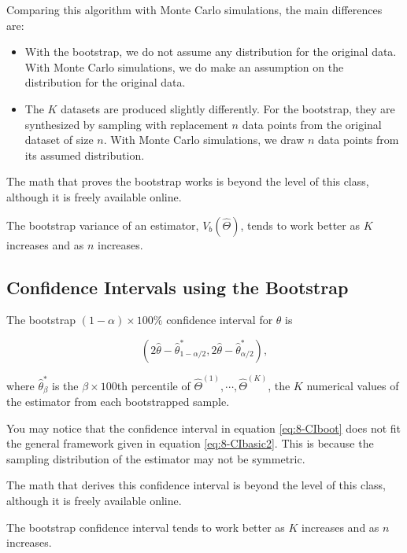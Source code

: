 \documentclass[
]{book}
\begin{document}
Comparing this algorithm with Monte Carlo simulations, the main differences are:

\begin{itemize}
\item
  With the bootstrap, we do not assume any distribution for the original data. With Monte Carlo simulations, we do make an assumption on the distribution for the original data.
\item
  The \(K\) datasets are produced slightly differently. For the bootstrap, they are synthesized by sampling with replacement \(n\) data points from the original dataset of size \(n\). With Monte Carlo simulations, we draw \(n\) data points from its assumed distribution.
\end{itemize}

The math that proves the bootstrap works is beyond the level of this class, although it is freely available online.

The bootstrap variance of an estimator, \(V_b(\hat{\Theta})\), tends to work better as \(K\) increases and as \(n\) increases.

\subsection{Confidence Intervals using the Bootstrap}\label{confidence-intervals-using-the-bootstrap}

The bootstrap \((1-\alpha) \times 100\%\) confidence interval for \(\theta\) is

\begin{equation} 
\left( 2 \hat{\theta} - \hat{\theta}_{1-\alpha/2}^*, 2 \hat{\theta} - \hat{\theta}_{\alpha/2}^* \right), 
\label{eq:8-CIboot}
\end{equation}

where \(\hat{\theta}_{\beta}^*\) is the \(\beta \times 100\)th percentile of \(\hat{\Theta}^{(1)}, \cdots, \hat{\Theta}^{(K)}\), the \(K\) numerical values of the estimator from each bootstrapped sample.

You may notice that the confidence interval in equation \eqref{eq:8-CIboot} does not fit the general framework given in equation \eqref{eq:8-CIbasic2}. This is because the sampling distribution of the estimator may not be symmetric.

The math that derives this confidence interval is beyond the level of this class, although it is freely available online.

The bootstrap confidence interval tends to work better as \(K\) increases and as \(n\) increases.
\end{document}
